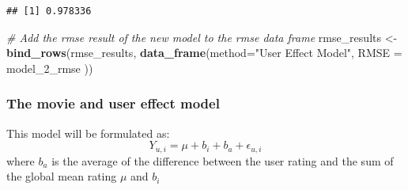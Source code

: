 \documentclass[]{article}
\newenvironment{Shaded}{\begin{snugshade}}{\end{snugshade}}
\newcommand{\KeywordTok}[1]{\textcolor[rgb]{0.13,0.29,0.53}{\textbf{#1}}}
\newcommand{\DataTypeTok}[1]{\textcolor[rgb]{0.13,0.29,0.53}{#1}}
\newcommand{\StringTok}[1]{\textcolor[rgb]{0.31,0.60,0.02}{#1}}
\newcommand{\CommentTok}[1]{\textcolor[rgb]{0.56,0.35,0.01}{\textit{#1}}}
\newcommand{\OperatorTok}[1]{\textcolor[rgb]{0.81,0.36,0.00}{\textbf{#1}}}
\newcommand{\NormalTok}[1]{#1}
\begin{document}
\begin{verbatim}
## [1] 0.978336
\end{verbatim}

\begin{Shaded}
\begin{Highlighting}[]
\CommentTok{# Add the rmse result of the new model to the rmse data frame}
\NormalTok{rmse_results <-}\StringTok{ }\KeywordTok{bind_rows}\NormalTok{(rmse_results,}
                          \KeywordTok{data_frame}\NormalTok{(}\DataTypeTok{method=}\StringTok{"User Effect Model"}\NormalTok{,  }
                                     \DataTypeTok{RMSE =}\NormalTok{ model_2_rmse ))}
\end{Highlighting}
\end{Shaded}

\subsubsection{The movie and user effect
model}\label{the-movie-and-user-effect-model}

This model will be formulated as:
\[ Y_{u,i} = \mu + b_i +b_a + \epsilon_{u,i} \] where \(b_a\) is the
average of the difference between the user rating and the sum of the
global mean rating \(\mu\) and \(b_i\)

\begin{Shaded}
\end{Shaded}
\end{document}
